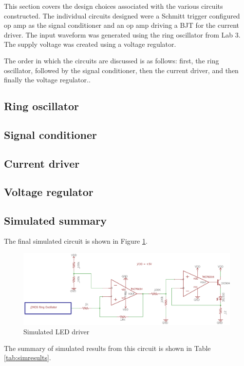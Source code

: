 



This section covers the design choices associated with the various circuits constructed. The individual circuits designed were a Schmitt trigger configured op amp as the signal conditioner and an op amp driving a BJT for the current driver. The input waveform was generated using the ring oscillator from Lab 3. The supply voltage was created using a voltage regulator.

The order in which the circuits are discussed is as follows: first, the ring oscillator, followed by the signal conditioner, then the current driver, and then finally the voltage regulator.. 

\subsection{Ring oscillator}


\subsection{Signal conditioner}


\subsection{Current driver}


\subsection{Voltage regulator}



\subsection{Simulated summary}
The final simulated circuit is shown in Figure \ref{fig:finalschemlab4}.

\begin{figure}[H]
	\centering
	\includegraphics[width=0.7\linewidth]{CircuitDevelopment/FinalschemLab4}
	\caption[Simulated circuit]{Simulated LED driver}
	\label{fig:finalschemlab4}
\end{figure}
The summary of simulated results from this circuit is shown in Table \ref{tab:simresults}.

